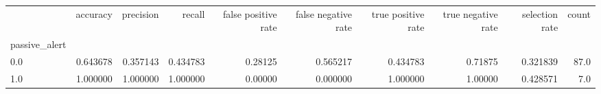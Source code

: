 \begin{tabular}{lrrrrrrrrr}
\toprule
{} &  accuracy &  precision &    recall &  false positive rate &  false negative rate &  true positive rate &  true negative rate &  selection rate &  count \\
passive\_alert &           &            &           &                      &                      &                     &                     &                 &        \\
\midrule
0.0           &  0.643678 &   0.357143 &  0.434783 &              0.28125 &             0.565217 &            0.434783 &             0.71875 &        0.321839 &   87.0 \\
1.0           &  1.000000 &   1.000000 &  1.000000 &              0.00000 &             0.000000 &            1.000000 &             1.00000 &        0.428571 &    7.0 \\
\bottomrule
\end{tabular}
